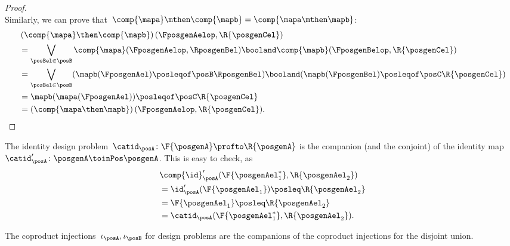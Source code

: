 \begin{proof}
\begin{equation}
    \end{equation}
    Similarly, we can prove that~$\comp{\mapa}\mthen \comp{\mapb}=\comp{\mapa\mthen \mapb}$:
    \begin{equation}
        \begin{aligned}
            ~ & \left(\comp{\mapa}\then \comp{\mapb}\right)(\FposgenAelop,\R{\posgenCel})                                                            \\
              & =\bigvee_{\posBel\in \posB} \comp{\mapa}(\FposgenAelop,\RposgenBel)\booland\comp{\mapb}(\FposgenBelop,\R{\posgenCel})                \\%
              & =\bigvee_{\posBel\in \posB} (\mapb(\FposgenAel)\posleqof\posB \RposgenBel)\booland (\mapb(\FposgenBel)\posleqof\posC \R{\posgenCel}) \\
              & =\mapb(\mapa(\FposgenAel))\posleqof\posC \R{\posgenCel}                                                                              \\
              & =\left(\comp{\mapa\then \mapb}\right)(\FposgenAelop,\R{\posgenCel}).
        \end{aligned}
    \end{equation}
\end{proof}

\begin{example}
    The identity design problem~$\catid_\posA\colon \F{\posgenA} \profto \R{\posgenA}$ is the companion (and the conjoint) of the identity map~$\catid_\posA'\colon \posgenA \toinPos \posgenA$.
    This is easy to check, as
    \begin{equation}
        \begin{aligned}
            ~ & \comp{\id}_\posA'(\F{\posgenAel_1^*},\R{\posgenAel_2}) \\
              & =\id_\posA'(\F{\posgenAel_1})\posleq \R{\posgenAel_2}  \\
              & =\F{\posgenAel_1}\posleq \R{\posgenAel_2}              \\
              & =\catid_\posA(\F{\posgenAel_1^*},\R{\posgenAel_2}).
        \end{aligned}
    \end{equation}
\end{example}

\begin{example}
    The coproduct injections~$\iota_\posA, \iota_\posB$ for design problems are the companions of the coproduct injections for the disjoint union.
\end{example}

